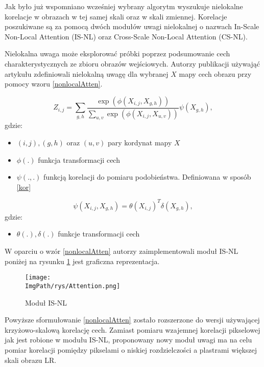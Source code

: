 \documentclass[a4paper,12pt,twoside,openany]{report}
\newcommand{\ImgPath}{.}
\begin{document}
	Jak było już wspomniano wcześniej wybrany algorytm wyszukuje nielokalne korelacje w obrazach w tej samej skali oraz w skali zmiennej. Korelacje poszukiwane są za pomocą dwóch modułów uwagi nielokalnej o nazwach  In-Scale Non-Local Attention (IS-NL) oraz Cross-Scale Non-Local Attention (CS-NL).
	
	Nielokalna uwaga może eksplorować próbki poprzez podsumowanie cech charakterystycznych ze zbioru obrazów wejściowych. Autorzy publikacji używająć artykułu \cite{NonLocalAttention} zdefiniowali nielokalną uwagę dla wybranej $X$ mapy cech obrazu przy pomocy wzoru \ref{nonlocalAtten}.
	
	\begin{equation}
		Z_{i,j}= \sum_{g,h}\frac{\exp (\phi(X_{i,j},X_{g,h}))}{\sum_{u,v}\exp(\phi(X_{i,j},X_{u,v}))} \psi(X_{g,h}),
		\label{nonlocalAtten}
	\end{equation}
	gdzie: 
	\begin{itemize}
		\item $(i,j),(g,h)$ oraz $(u,v)$ pary kordynat mapy $X$
		\item $\phi(.)$ funkcja transformacji cech
		\item $\psi(.,.)$ funkcją korelacji do pomiaru podobieństwa. Definiowana w sposób \ref{kor}
	\end{itemize}
	\begin{equation}
		\psi(X_{i,j},X_{g,h}) = \theta(X_{i,j})^T \delta(X_{g,h}),
		\label{kor}
	\end{equation}
	gdzie: 
	\begin{itemize}
		\item $\theta(.), \delta(.)$ funkcje transformacji cech
	\end{itemize}

	W oparciu o wzór \ref{nonlocalAtten} autorzy zaimplementowali moduł IS-NL poniżej na rysunku \ref{IS-NL} jest graficzna reprezentacja.
	
	\begin{figure}[!htbp]
		\begin{center}
			\centering
			\texttt{[image: \\ImgPath/rys/Attention.png]}
		\end{center}
		\caption{Moduł IS-NL}
		\label{IS-NL}
	\end{figure}

	Powyższe sformułowanie \ref{nonlocalAtten} zostało rozszerzone do wersji używającej krzyżowo-skalową korelację cech. Zamiast pomiaru wzajemnej korelacji pikselowej jak jest robione w modułu IS-NL, proponowany nowy moduł uwagi ma na celu pomiar korelacji pomiędzy pikselami o niskiej rozdzielczości a plastrami większej skali obrazu LR.
	
\end{document}
